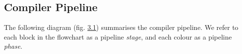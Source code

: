 \vspace{-3mm}

\subsection{Compiler Pipeline}

\label{sec:3.1.1}

\vspace{-1mm}

The following diagram (fig. \hyperref[fig:3.1]{3.1}) summarises the compiler pipeline. We refer to each block in the flowchart as a pipeline \textit{stage}, and each colour as a pipeline \textit{phase}.

\vspace{-1mm}


